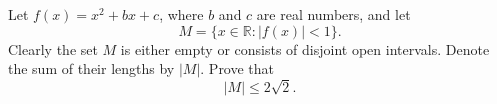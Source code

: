Let \(f(x) = x^2 + bx + c\), where \(b\) and \(c\) are real numbers, and let \[M = \{x \in \mathbb{R} : |f(x)| < 1\}.\]
Clearly the set \(M\) is either empty or consists of disjoint open intervals.
Denote the sum of their lengths by \(|M|\).
Prove that \[|M| \le 2\sqrt{2}.\]